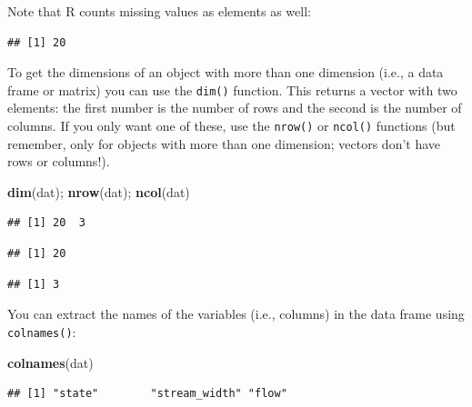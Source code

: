 \documentclass[]{book}
\newenvironment{Shaded}{\begin{snugshade}}{\end{snugshade}}
\newcommand{\KeywordTok}[1]{\textcolor[rgb]{0.13,0.29,0.53}{\textbf{#1}}}
\newcommand{\OperatorTok}[1]{\textcolor[rgb]{0.81,0.36,0.00}{\textbf{#1}}}
\newcommand{\NormalTok}[1]{#1}
\theoremstyle{definition}
\theoremstyle{definition}
\theoremstyle{definition}
\theoremstyle{remark}
\begin{document}
Note that R counts missing values as elements as well:

\begin{Shaded}
\end{Shaded}

\begin{verbatim}
## [1] 20
\end{verbatim}

To get the dimensions of an object with more than one dimension (i.e., a
data frame or matrix) you can use the \texttt{dim()} function. This
returns a vector with two elements: the first number is the number of
rows and the second is the number of columns. If you only want one of
these, use the \texttt{nrow()} or \texttt{ncol()} functions (but
remember, only for objects with more than one dimension; vectors don't
have rows or columns!).

\begin{Shaded}
\begin{Highlighting}[]
\KeywordTok{dim}\NormalTok{(dat); }\KeywordTok{nrow}\NormalTok{(dat); }\KeywordTok{ncol}\NormalTok{(dat)}
\end{Highlighting}
\end{Shaded}

\begin{verbatim}
## [1] 20  3
\end{verbatim}

\begin{verbatim}
## [1] 20
\end{verbatim}

\begin{verbatim}
## [1] 3
\end{verbatim}

You can extract the names of the variables (i.e., columns) in the data
frame using \texttt{colnames()}:

\begin{Shaded}
\begin{Highlighting}[]
\KeywordTok{colnames}\NormalTok{(dat)}
\end{Highlighting}
\end{Shaded}

\begin{verbatim}
## [1] "state"        "stream_width" "flow"
\end{verbatim}
\end{document}
